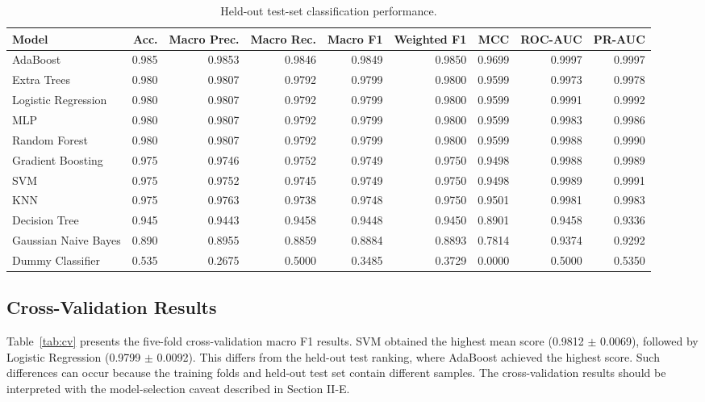 \documentclass[conference]{IEEEtran}
\begin{document}
\begin{table}[t]
\centering
\caption{Held-out test-set classification performance.}
\label{tab:test}
\scriptsize
\setlength{\tabcolsep}{4pt}
\begin{tabular}{lrrrrrrrr}
\toprule
Model & Acc. & Macro Prec. & Macro Rec. & Macro F1 & Weighted F1 & MCC & ROC-AUC & PR-AUC\\
\midrule
AdaBoost & 0.985 & 0.9853 & 0.9846 & 0.9849 & 0.9850 & 0.9699 & 0.9997 & 0.9997\\
Extra Trees & 0.980 & 0.9807 & 0.9792 & 0.9799 & 0.9800 & 0.9599 & 0.9973 & 0.9978\\
Logistic Regression & 0.980 & 0.9807 & 0.9792 & 0.9799 & 0.9800 & 0.9599 & 0.9991 & 0.9992\\
MLP & 0.980 & 0.9807 & 0.9792 & 0.9799 & 0.9800 & 0.9599 & 0.9983 & 0.9986\\
Random Forest & 0.980 & 0.9807 & 0.9792 & 0.9799 & 0.9800 & 0.9599 & 0.9988 & 0.9990\\
Gradient Boosting & 0.975 & 0.9746 & 0.9752 & 0.9749 & 0.9750 & 0.9498 & 0.9988 & 0.9989\\
SVM & 0.975 & 0.9752 & 0.9745 & 0.9749 & 0.9750 & 0.9498 & 0.9989 & 0.9991\\
KNN & 0.975 & 0.9763 & 0.9738 & 0.9748 & 0.9750 & 0.9501 & 0.9981 & 0.9983\\
Decision Tree & 0.945 & 0.9443 & 0.9458 & 0.9448 & 0.9450 & 0.8901 & 0.9458 & 0.9336\\
Gaussian Naive Bayes & 0.890 & 0.8955 & 0.8859 & 0.8884 & 0.8893 & 0.7814 & 0.9374 & 0.9292\\
Dummy Classifier & 0.535 & 0.2675 & 0.5000 & 0.3485 & 0.3729 & 0.0000 & 0.5000 & 0.5350\\
\bottomrule
\end{tabular}
\end{table}

\subsection{Cross-Validation Results}
Table~\ref{tab:cv} presents the five-fold cross-validation macro F1 results. SVM obtained the highest mean score (0.9812 $\pm$ 0.0069), followed by Logistic Regression (0.9799 $\pm$ 0.0092). This differs from the held-out test ranking, where AdaBoost achieved the highest score. Such differences can occur because the training folds and held-out test set contain different samples. The cross-validation results should be interpreted with the model-selection caveat described in Section II-E.
\end{document}
